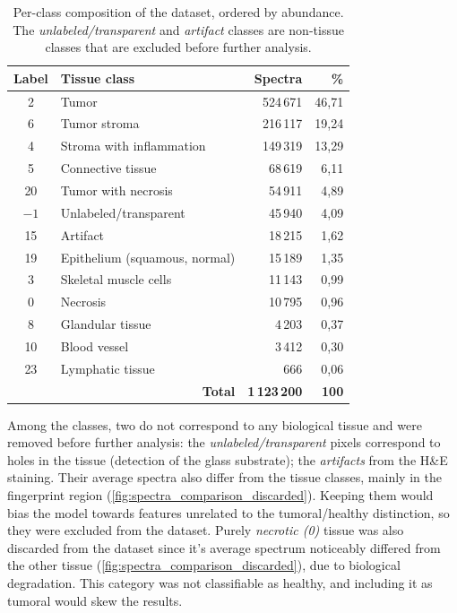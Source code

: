 \begin{table}[ht]
    \centering
    \begin{tabular}{|c|l|r|r|}
        \hline
        \textbf{Label} & \textbf{Tissue class} & \textbf{Spectra} & \textbf{\%} \\
        \hline
        2  & Tumor                         & 524\,671 & 46,71 \\
        6  & Tumor stroma                  & 216\,117 & 19,24 \\
        4  & Stroma with inflammation      & 149\,319 & 13,29 \\
        5  & Connective tissue             & 68\,619  & 6,11  \\
        20 & Tumor with necrosis           & 54\,911  & 4,89  \\
        $-1$ & Unlabeled/transparent       & 45\,940  & 4,09  \\
        15 & Artifact                      & 18\,215  & 1,62  \\
        19 & Epithelium (squamous, normal) & 15\,189  & 1,35  \\
        3  & Skeletal muscle cells         & 11\,143  & 0,99  \\
        0  & Necrosis                      & 10\,795  & 0,96  \\
        8  & Glandular tissue              & 4\,203   & 0,37  \\
        10 & Blood vessel                  & 3\,412   & 0,30  \\
        23 & Lymphatic tissue              & 666      & 0,06  \\
        \hline
        \multicolumn{2}{|r|}{\textbf{Total}} & \textbf{1\,123\,200} & \textbf{100} \\
        \hline
    \end{tabular}
    \caption{Per-class composition of the dataset, ordered by abundance. The \textit{unlabeled/transparent} and \textit{artifact} classes are non-tissue classes that are excluded before further analysis.}
    \label{tab:label-distribution}
\end{table}

Among the classes, two do not correspond to any biological tissue and were removed before further analysis: the \textit{unlabeled/transparent} pixels correspond to holes in the tissue (detection of the glass substrate); the \textit{artifacts} from the H\&E staining. Their average spectra also differ from the tissue classes, mainly in the fingerprint region (\cref{fig:spectra_comparison_discarded}). Keeping them would bias the model towards features unrelated to the tumoral/healthy distinction, so they were excluded from the dataset. Purely \textit{necrotic (0)} tissue was also discarded from the dataset since it's average spectrum noticeably differed from the other tissue (\cref{fig:spectra_comparison_discarded}), due to biological degradation. This category was not classifiable as healthy, and including it as tumoral would skew the results.

